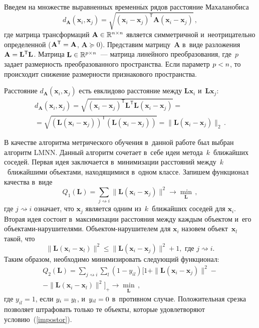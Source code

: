 \begin{multicols}{2}
Введем на множестве выравненных временн$\acute{\mbox{ы}}$х рядов расстояние Махаланобиса
$$
    d_\mathbf{A} (\mathbf{x}_i, \mathbf{x}_j) = \sqrt{(\mathbf{x}_i - \mathbf{x}_j)^\mathsf{T} \mathbf{A} (\mathbf{x}_i - \mathbf{x}_j)}\,,
$$
где матрица трансформаций $\mathbf{A} \hm\in \mathbb{R}^{n \times n}$ 
является симметричной и~неотрицательно определенной ($\mathbf{A}^\mathsf{T} \hm= 
\mathbf{A}$, $\mathbf{A} \succeq 0$).
Представим матрицу~$\mathbf{A}$ в~виде разложения 
$\mathbf{A} \hm= \mathbf{L}^\mathsf{T}  \mathbf{L}$.
Матрица $\mathbf{L}\hm \in \mathbb{R}^{p \times n}$~--- мат\-ри\-ца линейного преобразования, 
где~$p$ задает раз\-мер\-ность преобразованного пространства. Если па\-ра\-метр $p\hm < n$, 
то происходит снижение размерности признакового пространства.

Расстояние $d_\mathbf{A} (\mathbf{x}_i, \mathbf{x}_j)$ есть евклидово 
рас\-сто\-яние между $\mathbf{Lx}_i$ и~$\mathbf{Lx}_j$:
\begin{multline*}
    d_\mathbf{A} (\mathbf{x}_i, \mathbf{x}_j) = \sqrt{(\mathbf{x}_i - 
    \mathbf{x}_j)^\mathsf{T} \mathbf{L}^\mathsf{T} \mathbf{L} (\mathbf{x}_i - 
    \mathbf{x}_j)} = {}\\
    {}=\sqrt{(\mathbf{L} (\mathbf{x}_i - \mathbf{x}_j))^\mathsf{T} 
    (\mathbf{L} (\mathbf{x}_i - \mathbf{x}_j))} =
     \|\mathbf{L} (\mathbf{x}_i - \mathbf{x}_j)\|_2\,.
\end{multline*}

В качестве алгоритма метрического обучения в~данной работе был выбран 
алгоритм LMNN. \mbox{Данный} алгоритм сочетает в~себе идеи метода~$k$~ближайших соседей. 
Первая идея заключается в~минимизации расстояний между~$k$~ближайшими объектами, 
находящимися в~одном клас\-се. Запишем функционал качества в~виде
$$
    Q_1(\mathbf{L}) = \sum\limits_{j \rightsquigarrow i} \|\mathbf{L}(\mathbf{x}_i - 
    \mathbf{x}_j)\|^2 \rightarrow \min\limits_{\mathbf{L}}\,,
$$
где $j \rightsquigarrow i$ означает, что $\mathbf{x}_j$ является одним из~$k$~ближайших соседей для $\mathbf{x}_i$.
Вторая идея состоит в~максимизации расстояния между каждым объектом и~его 
объ\-ек\-та\-ми-на\-ру\-ши\-те\-ля\-ми. 
Объек\-том-на\-ру\-ши\-те\-лем для $\mathbf{x}_i$ назовем объект~$\mathbf{x}_l$ 
такой, что
\begin{equation}
\label{impostor}
    \|\mathbf{L}(\mathbf{x}_i - \mathbf{x}_l)\|^2 \leq 
    \|\mathbf{L}(\mathbf{x}_i - \mathbf{x}_j)\|^2 + 1,  
    \mbox{ где } j \rightsquigarrow i.
\end{equation}
Таким образом, необходимо минимизировать следующий функционал:
\begin{multline*}
    Q_2(\mathbf{L}) = \sum\limits_{j \rightsquigarrow i} 
    \sum\limits_l(1 - y_{il})
    \bigl[1 + \|\mathbf{L}(\mathbf{x}_i - \mathbf{x}_j)\|^2 -{}\\
    {}- \|\mathbf{L}
    (\mathbf{x}_i - \mathbf{x}_l)\|^2\bigr]_+ 
    \rightarrow \min\limits_{\mathbf{L}}\,,
\end{multline*}
где $y_{il} = 1$, если $y_i \hm= y_l$, и~$y_{il} \hm= 0$ в~противном случае.
Положительная срезка позволяет штрафовать только те объекты, которые 
удовлетворяют условию~(\ref{impostor}).


\end{multicols}
